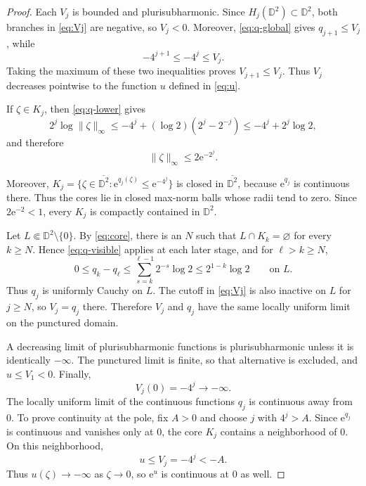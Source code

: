 \documentclass[10pt,a4paper]{amsart}
\newcommand{\e}{\mathrm e}
\begin{document}
\begin{proof}
Each $V_j$ is bounded and plurisubharmonic. Since $H_j(\mathbb D^2)\subset\mathbb D^2$, both branches in \eqref{eq:Vj} are negative, so $V_j<0$. Moreover, \eqref{eq:q-global} gives $q_{j+1}\le V_j$, while
\[
  -4^{j+1}\le-4^j\le V_j.
\]
Taking the maximum of these two inequalities proves $V_{j+1}\le V_j$. Thus $V_j$ decreases pointwise to the function $u$ defined in \eqref{eq:u}.

If $\zeta\in K_j$, then \eqref{eq:q-lower} gives
\[
  2^j\log\|\zeta\|_\infty \le-4^j+(\log 2)\left(2^j-2^{-j}\right) \le-4^j+2^j\log 2,
\]
and therefore
\begin{equation}\label{eq:core}
  \|\zeta\|_\infty
  \le 2\e^{-2^j}.
\end{equation}

Moreover, $K_j=\{\zeta\in\overline{\mathbb D^2}:\e^{q_j(\zeta)}\le\e^{-4^j}\}$ is closed in $\overline{\mathbb D^2}$,
because $\e^{q_j}$ is continuous there. Thus the cores lie in closed max-norm balls whose radii tend to zero. Since $2\e^{-2}<1$, every $K_j$ is compactly contained in $\mathbb D^2$.

Let $L\Subset \mathbb D^2\setminus\{0\}$. By \eqref{eq:core}, there is an $N$ such that $L\cap K_k=\varnothing$ for every $k\ge N$. Hence \eqref{eq:q-visible} applies at each later stage, and for $\ell>k\ge N$,
\[
  0\le q_k-q_\ell
  \le\sum_{s=k}^{\ell-1}2^{-s}\log 2
  \le2^{1-k}\log 2
  \qquad\text{on }L.
\]
Thus $q_j$ is uniformly Cauchy on $L$. The cutoff in \eqref{eq:Vj} is also inactive on $L$ for $j\ge N$, so $V_j=q_j$ there. Therefore $V_j$ and $q_j$ have the same locally uniform limit on the punctured domain.

A decreasing limit of plurisubharmonic functions is plurisubharmonic unless it is identically $-\infty$. The punctured limit is finite, so that alternative is excluded, and $u\le V_1<0$. Finally,
\[
  V_j(0)=-4^j\longrightarrow-\infty.
\]
The locally uniform limit of the continuous functions $q_j$ is continuous away from $0$. To prove continuity at the pole, fix $A>0$ and choose $j$ with $4^j>A$. Since $\e^{q_j}$ is continuous and vanishes only at $0$, the core $K_j$ contains a neighborhood of $0$. On this neighborhood,
\[
  u\le V_j=-4^j<-A.
\]
Thus $u(\zeta)\to-\infty$ as $\zeta\to0$, so $\e^u$ is continuous at $0$ as well.
\end{proof}
\end{document}
